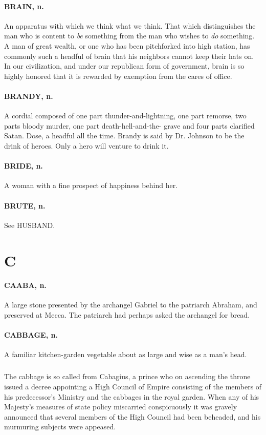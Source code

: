 \documentclass[11pt]{article}
\begin{document}
\paragraph{BRAIN, n.} An apparatus with which we think what we think.  That which
distinguishes the man who is content to {\em be} something from the man
who wishes to {\em do} something.  A man of great wealth, or one who has
been pitchforked into high station, has commonly such a headful of
brain that his neighbors cannot keep their hats on.  In our
civilization, and under our republican form of government, brain is so
highly honored that it is rewarded by exemption from the cares of
office.

\paragraph{BRANDY, n.}  A cordial composed of one part thunder-and-lightning, one
part remorse, two parts bloody murder, one part death-hell-and-the-
grave and four parts clarified Satan.  Dose, a headful all the time.
Brandy is said by Dr. Johnson to be the drink of heroes.  Only a hero
will venture to drink it.

\paragraph{BRIDE, n.}  A woman with a fine prospect of happiness behind her.

\paragraph{BRUTE, n.}  See HUSBAND.



\section*{C}



\paragraph{CAABA, n.}  A large stone presented by the archangel Gabriel to the
patriarch Abraham, and preserved at Mecca.  The patriarch had perhaps
asked the archangel for bread.

\paragraph{CABBAGE, n.}  A familiar kitchen-garden vegetable about as large and
wise as a man's head.
\subparagraph{}   The cabbage is so called from Cabagius, a prince who on ascending
the throne issued a decree appointing a High Council of Empire
consisting of the members of his predecessor's Ministry and the
cabbages in the royal garden.  When any of his Majesty's measures of
state policy miscarried conspicuously it was gravely announced that
several members of the High Council had been beheaded, and his
murmuring subjects were appeased.
\end{document}
